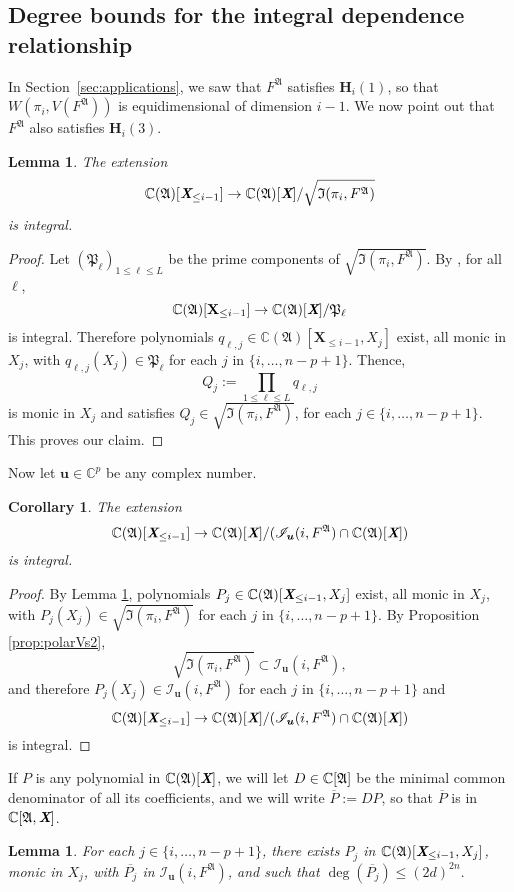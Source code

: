 \documentclass[a4paper]{article}
\def\fp{\mathfrak{P}}
\def\A{\mathfrak{A}}
\def\Xb{\textit{\textbf{X}}}
\def\ub{{\bm u}}
\def\pjb{\overline{P_{j}}}
\def\C{\mathbb{C}}
\def\WifA{W(\pi_i,V(F^{\A}))}
\def\IifAr{\sqrt{\mathfrak{I}(\pi_i,F^{\A})}}
\def\IifA{\mathfrak{I}(\pi_i,F^{\A})}
\def\IilfA{\mathscr{I}_{\ub}(i,F^{\A})}
\newtheorem{corollary}[theorem]{Corollary}
\newtheorem{lemma}[theorem]{Lemma}
\begin{document}
\subsection{Degree bounds for the integral dependence relationship} 
%
In Section~\ref{sec:applications}, we saw that
$F^\A$ satisfies $\textbf{H}_i(1)$, so that $\WifA$ is equidimensional of dimension $i-1$. We
now point out that $F^\A$ also satisfies $\textbf{H}_i(3)$.
\begin{lemma}\label{lem:6.1}
 The extension $$\C(\A)[\Xb_{\leq i-1}]\rightarrow
 \C(\A)[\Xb]/\IifAr$$ is integral.
\end{lemma}
%
\begin{proof}
  Let $(\fp_\ell)_{1 \le \ell \leq L}$ be the prime components of $\IifAr$. By \cite[Proposition 1]{EMP}, for all
  $\ell$,
  \[
    \C(\A)[\textbf{X}_{\leq i-1}]\rightarrow\C(\A)[\Xb]/\fp_\ell
  \] 
  is integral. Therefore polynomials
  $q_{\ell,j}\in\C(\A)[\textbf{X}_{\leq i-1},X_j]$ exist, all monic in
  $X_j$, with $q_{\ell,j}(X_j)\in \fp_\ell$ for each $j$ in
  $\{i,\hdots,n-p+1\}.$ Thence, \[Q_{j} := \prod_{1 \le \ell\le L}
  q_{\ell,j}\] is monic in $X_j$ and satisfies $ Q_{j} \in \sqrt{\IifA}$, for
  each $j \in \{i,\hdots,n-p+1\}.$ This proves our claim.
\end{proof}
%
\noindent 
Now let $\ub \in \C^p$ be any complex number. 
\begin{corollary}\label{lem:6.2}
 The extension $$\C(\A)[\Xb_{\leq i-1}]\rightarrow
 \C(\A)[\Xb]/(\IilfA \cap \C(\A)[\Xb])$$ is integral.
\end{corollary}
%
\begin{proof}
By Lemma \ref{lem:6.1}, polynomials
  $P_{j}\in\C(\A)[\Xb_{\leq i-1},X_j]$ exist, all monic in
  $X_j$, with $P_{j}(X_j)\in \IifAr$ for each $j$ in
  $\{i,\hdots,n-p+1\}.$ By Proposition \ref{prop:polarVs2}, 
  \[
  \sqrt{\IifA} \subset \IilfA,
  \]
  and therefore $P_{j}(X_j)\in \IilfA$ for each $j$ in 
  $\{i,\hdots,n-p+1\}$ and 
  \[
  \C(\A)[\Xb_{\leq i-1}]\rightarrow
 \C(\A)[\Xb]/(\IilfA \cap \C(\A)[\Xb])
  \]
 is integral.
\end{proof}
%
\noindent
If $P$ is any polynomial in $\C(\frak A)[\Xb]$, we will let
$D \in \C[\frak A]$ be the minimal common denominator of all its
coefficients, and we will write $\overline P := D P$, so that
$\overline P$ is in $\C[\A,\Xb]$.


    \begin{lemma} 
    For each $j \in \{i,\dots,n-p+1\}$, there exists $P_j$ in $
    \C(\A)[\Xb_{\leq i-1},X_j]$, monic in $X_j$, with $\pjb$ in
    $\IilfA$, and such that $\deg(\pjb)\leq (2d)^{2n}.$
    \end{lemma} 
\end{document}
